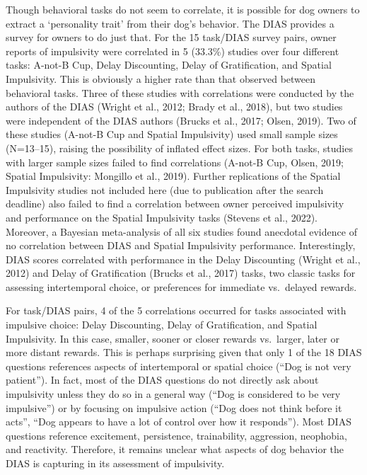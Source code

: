 \documentclass[
  ,pub,floatsintext]{apa6}
\begin{document}
Though behavioral tasks do not seem to correlate, it is possible for dog owners to extract a `personality trait' from their dog's behavior. The DIAS provides a survey for owners to do just that. For the 15 task/DIAS survey pairs, owner reports of impulsivity were correlated in 5 (33.3\%) studies over four different tasks: A-not-B Cup, Delay Discounting, Delay of Gratification, and Spatial Impulsivity. This is obviously a higher rate than that observed between behavioral tasks. Three of these studies with correlations were conducted by the authors of the DIAS (Wright et al., 2012; Brady et al., 2018), but two studies were independent of the DIAS authors (Brucks et al., 2017; Olsen, 2019). Two of these studies (A-not-B Cup and Spatial Impulsivity) used small sample sizes (N=13--15), raising the possibility of inflated effect sizes. For both tasks, studies with larger sample sizes failed to find correlations (A-not-B Cup, Olsen, 2019; Spatial Impulsivity: Mongillo et al., 2019). Further replications of the Spatial Impulsivity studies not included here (due to publication after the search deadline) also failed to find a correlation between owner perceived impulsivity and performance on the Spatial Impulsivity tasks (Stevens et al., 2022). Moreover, a Bayesian meta-analysis of all six studies found anecdotal evidence of no correlation between DIAS and Spatial Impulsivity performance. Interestingly, DIAS scores correlated with performance in the Delay Discounting (Wright et al., 2012) and Delay of Gratification (Brucks et al., 2017) tasks, two classic tasks for assessing intertemporal choice, or preferences for immediate vs.~delayed rewards.

For task/DIAS pairs, 4 of the 5 correlations occurred for tasks associated with impulsive choice: Delay Discounting, Delay of Gratification, and Spatial Impulsivity. In this case, smaller, sooner or closer rewards vs.~larger, later or more distant rewards. This is perhaps surprising given that only 1 of the 18 DIAS questions references aspects of intertemporal or spatial choice (``Dog is not very patient''). In fact, most of the DIAS questions do not directly ask about impulsivity unless they do so in a general way (``Dog is considered to be very impulsive'') or by focusing on impulsive action (``Dog does not think before it acts'', ``Dog appears to have a lot of control over how it responds''). Most DIAS questions reference excitement, persistence, trainability, aggression, neophobia, and reactivity. Therefore, it remains unclear what aspects of dog behavior the DIAS is capturing in its assessment of impulsivity.
\end{document}
